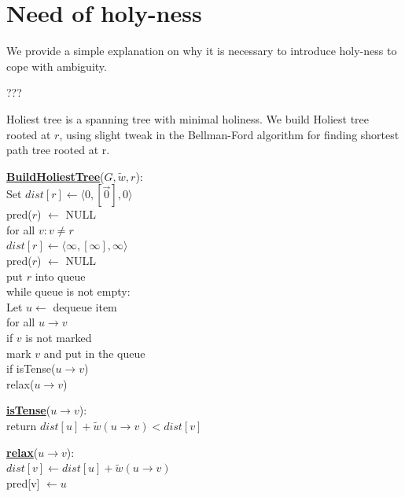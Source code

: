 \documentclass{article}
\begin{document}
\section{Need of holy-ness}
We provide a simple explanation on why it is necessary to introduce holy-ness
to cope with ambiguity.

{\color{red} ???}

\newpage

Holiest tree is a spanning tree with minimal holiness. We build Holiest tree 
rooted at $r$, using slight tweak in the Bellman-Ford algorithm for finding 
shortest path tree rooted at r. \\

\begin{minipage}[t]{0.48\linewidth}
\begin{algorithm}
\textbf{\underline{BuildHoliestTree}}($G, \tilde w , r$): \\ \quad
Set $dist[r] \leftarrow \langle 0, [\vec{0}], 0 \rangle$ \\ \quad \quad
    pred($r$) $\leftarrow$ NULL \\ \quad
for all $v : v \neq r$ \\ \quad \quad
    $dist[r] \leftarrow \langle \infty, [\infty], \infty \rangle$ \\ \quad \quad
    pred($r$) $\leftarrow$ NULL \\ \quad
put $r$ into queue \\ \quad
while queue is not empty: \\ \quad \quad
    Let $u \leftarrow$ dequeue item \\ \quad \quad
    for all $u \rightarrow v$ \\ \qquad \quad
        if $v$ is not marked \\ \quad \qquad \quad
           mark $v$ and put in the queue \\ \qquad \quad
        if isTense($u \rightarrow v$) \\ \quad \qquad \quad
           relax($u \rightarrow v$)
\end{algorithm}
\end{minipage}
\hfill%
\hspace{-4cm}
\begin{minipage}[t]{0.48\linewidth}
\begin{algorithm}
\textbf{\underline{isTense}}($u \rightarrow v$): \\ \quad
return $dist[u] + \tilde w(u \rightarrow v) < dist[v]$ \\

\end{algorithm}

\vspace{0.5cm}

\begin{algorithm}
\textbf{\underline{relax}}($u \rightarrow v$): \\ \quad
$dist[v] \leftarrow dist[u] + \tilde w(u \rightarrow v)$ \\ \quad
pred[v] $\leftarrow u$ \\
\end{algorithm}
\end{minipage}
\end{document}
